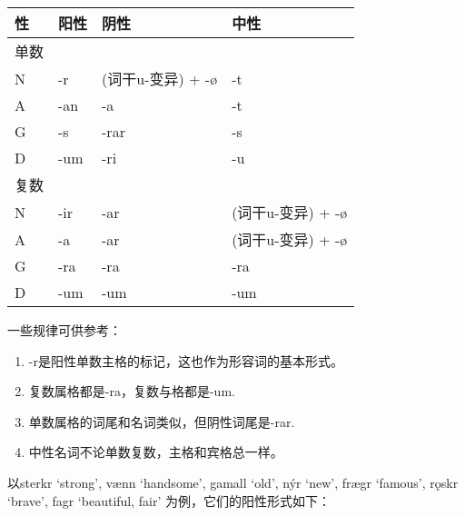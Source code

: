 \begin{longtable}{llll}
    \toprule
    性   & 阳性 & 阴性              & 中性              \\
    \midrule
    \endhead
    \bottomrule
    \endfoot
    单数 &      &                   &                   \\
    N    & -r   & (词干u-变异) + -ø & -t                \\
    A    & -an  & -a                & -t                \\
    G    & -s   & -rar              & -s                \\
    D    & -um  & -ri               & -u                \\
    复数 &      &                   &                   \\
    N    & -ir  & -ar               & (词干u-变异) + -ø \\
    A    & -a   & -ar               & (词干u-变异) + -ø \\
    G    & -ra  & -ra               & -ra               \\
    D    & -um  & -um               & -um               \\
\end{longtable}

一些规律可供参考：

\begin{info}
    \begin{enumerate}
        \item -r是阳性单数主格的标记，这也作为形容词的基本形式。
        \item 复数属格都是-ra，复数与格都是-um.
        \item 单数属格的词尾和名词类似，但阴性词尾是-rar.
        \item 中性名词不论单数复数，主格和宾格总一样。
    \end{enumerate}
\end{info}

以sterkr `strong‌', vænn `handsome‌', gamall `old‌', nýr `new‌', frægr
`famous‌', rǫskr `brave‌', fagr `beautiful, fair'
为例，它们的阳性形式如下：

